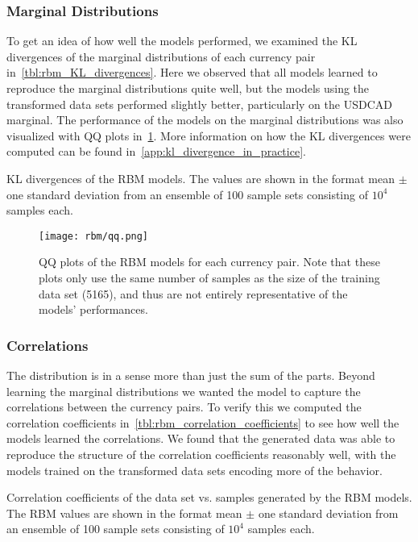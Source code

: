 \subsubsection{Marginal Distributions}
To get an idea of how well the models performed, we examined the KL divergences of the marginal distributions of each currency pair in~\cref{tbl:rbm_KL_divergences}.
Here we observed that all models learned to reproduce the marginal distributions quite well, but the models using the transformed data sets performed slightly better, particularly on the USDCAD marginal.
The performance of the models on the marginal distributions was also visualized with QQ plots in~\cref{fig:rbm_qq_plots}.
More information on how the KL divergences were computed can be found in~\cref{app:kl_divergence_in_practice}.
\begin{table}[!htb]
    \centering
    \begin{adjustbox}{max width=\textwidth}
        
    \end{adjustbox}
    \caption{
        KL divergences of the RBM models.
        The values are shown in the format mean \(\pm\) one standard deviation from an ensemble of 100 sample sets consisting of \( 10^4 \) samples each.
    }
    \label{tbl:rbm_KL_divergences}
\end{table}
\begin{figure}[!htb]
    \begin{center}
        \texttt{[image: rbm/qq.png]}
    \end{center}
    \caption{QQ plots of the RBM models for each currency pair. Note that these plots only use the same number of samples as the size of the training data set (5165), and thus are not entirely representative of the models' performances.}
    \label{fig:rbm_qq_plots}
\end{figure}

\subsubsection{Correlations}
The distribution is in a sense more than just the sum of the parts.
Beyond learning the marginal distributions we wanted the model to capture the correlations between the currency pairs.
To verify this we computed the correlation coefficients in~\cref{tbl:rbm_correlation_coefficients} to see how well the models learned the correlations.
We found that the generated data was able to reproduce the structure of the correlation coefficients reasonably well, with the models trained on the transformed data sets encoding more of the behavior.
\begin{table}[!htb]
    \centering
    \begin{adjustbox}{max width=\textwidth}
        
    \end{adjustbox}
    \caption{Correlation coefficients of the data set vs. samples generated by the RBM models. The RBM values are shown in the format mean \(\pm\) one standard deviation from an ensemble of 100 sample sets consisting of \( 10^4 \) samples each.}
    \label{tbl:rbm_correlation_coefficients}
\end{table}

